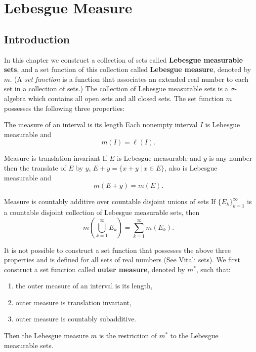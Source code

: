 \chapter{Lebesgue Measure}

\section{Introduction}
In this chapter we construct a collection of sets called \textbf{Lebesgue measurable sets}, and a set function of this collection called \textbf{Lebesgue measure}, denoted by $m$. 
(A \textit{set function} is a function that associates an extended real number to each set in a collection of sets.)
The collection of Lebesgue measurable sets is a $\sigma$-algebra which contains all open sets and all closed sets. The set function $m$ possesses the following three properties:
\begin{namedthm*}{The measure of an interval is its length}
Each nonempty interval $I$ is Lebesgue measurable and 
\[
m(I) = \ell(I).
\]
\end{namedthm*}
\begin{namedthm*}{Measure is translation invariant}
If $E$ is Lebesgue measurable and $y$ is any number then the translate of $E$ by $y$, $E+y = \{x+y \ |\ x \in E\}$, also is Lebesgue measurable and
\[
m(E+y) = m(E).
\]
\end{namedthm*}
\begin{namedthm*}{Measure is countably additive over countable disjoint unions of sets}
If $\{E_k\}_{k=1}^\infty$ is a countable disjoint collection of Lebesgue measurable sets, then
\[
m(\bigcup_{k=1}^\infty E_k) = \sum_{k=1}^\infty m(E_k).
\]
\end{namedthm*}
It is not possible to construct a set function that possesses the above three properties and is defined for all sets of real numbers (See Vitali sets).
We first construct a set function called \textbf{outer measure}, denoted by $m^*$, such that: 
\begin{enumerate}[label=(\roman*),align=left]
	\item the outer measure of an interval is its length,
	\item outer measure is translation invariant,
	\item outer measure is countably subadditive.
\end{enumerate}
Then the Lebesgue measure $m$ is the restriction of $m^*$ to the Lebesgue measurable sets.

